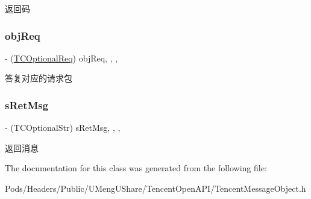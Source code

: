 返回码 \mbox{\label{interface_tencent_api_resp_af8228b8ebb3a1804ca137726ba774c27}} 
\subsubsection{\texorpdfstring{obj\+Req}{objReq}}
{\footnotesize\ttfamily -\/ (\mbox{\hyperlink{interface_tencent_api_req}{T\+C\+Optional\+Req}}) obj\+Req\hspace{0.3cm}{\ttfamily [read]}, {\ttfamily [write]}, {\ttfamily [nonatomic]}, {\ttfamily [retain]}}

答复对应的请求包 \mbox{\label{interface_tencent_api_resp_a114465068484407c6d1735a06aaf9091}} 
\subsubsection{\texorpdfstring{s\+Ret\+Msg}{sRetMsg}}
{\footnotesize\ttfamily -\/ (T\+C\+Optional\+Str) s\+Ret\+Msg\hspace{0.3cm}{\ttfamily [read]}, {\ttfamily [write]}, {\ttfamily [nonatomic]}, {\ttfamily [retain]}}

返回消息 

The documentation for this class was generated from the following file\+:\begin{DoxyCompactItemize}
\item 
Pods/\+Headers/\+Public/\+U\+Meng\+U\+Share/\+Tencent\+Open\+A\+P\+I/Tencent\+Message\+Object.\+h\end{DoxyCompactItemize}
